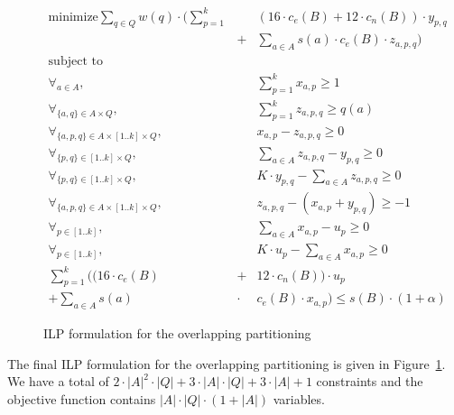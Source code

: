 \begin{figure}[!t]
\begin{eqnarray}
\text{minimize}  
    \sum_{q\in Q} w(q)\cdot \Big(\sum_{p=1}^{k} \!\!&&\!\! (16\cdot c_e(B) + 12\cdot c_n(B))\cdot y_{p,q}\nonumber\\
    &+& \sum_{a\in A} s(a)\cdot c_e(B)\cdot z_{a,p,q} \Big) \nonumber\\
\text{subject to}&&\nonumber\\
\forall_{a\in A}, 
    && \sum_{p=1}^{k} x_{a,p} \geq 1\nonumber\\
\forall_{\{a,q\}\in A\times Q},
    &&  \sum_{p=1}^{k} z_{a,p,q} \geq q(a) \nonumber\\
\forall_{\{a,p,q\}\in A\times [1..k]\times Q}, 
    && x_{a,p} - z_{a,p,q} \geq 0 \nonumber\\
\forall_{\{p,q\}\in [1..k]\times Q}, 
    &&  \sum_{a\in A} z_{a,p,q} - y_{p,q} \geq 0 \nonumber\\
\forall_{\{p,q\}\in [1..k]\times Q}, 
    &&  K\cdot y_{p,q} - \sum_{a\in A} z_{a,p,q}  \geq 0 \nonumber\\
\forall_{\{a,p,q\}\in A\times [1..k]\times Q}, 
    && z_{a,p,q} - (x_{a,p} + y_{p,q}) \geq -1 \nonumber\\
\forall_{p\in[1..k]},
    && \sum_{a\in A} x_{a,p} - u_p \geq 0 \nonumber\\
\forall_{p\in[1..k]},
    && K\cdot u_p - \sum_{a\in A} x_{a,p} \geq 0 \nonumber\\    
\sum_{p=1}^{k} \Big((16\cdot c_e(B) &+& 12 \cdot c_n(B)) \cdot u_p  \nonumber \\ 
+ \sum_{a\in A} s(a) \!\!&\cdot&\!\! c_e(B)\cdot x_{a,p}  \Big)\leq s(B)\cdot (1+\alpha)\nonumber
\end{eqnarray}
\caption{ILP formulation for the overlapping partitioning}
\label{fig:ov-ilp}
\end{figure}

The final ILP formulation for the overlapping partitioning is given in
Figure~\ref{fig:ov-ilp}. We have a total of $2\cdot|A|^2\cdot|Q| +
3\cdot|A|\cdot|Q| + 3\cdot|A| + 1$ constraints and the objective function
contains $|A|\cdot|Q|\cdot(1+|A|)$ variables. 

